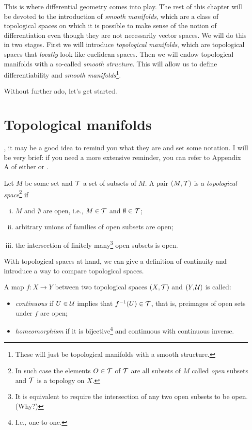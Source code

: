 This is where differential geometry comes into play.
The rest of this chapter will be devoted to the introduction of \emph{smooth manifolds}, which are a class of topological spaces on which it is possible to make sense of the notion of differentiation even though they are not necessarily vector spaces.
We will do this in two stages.
First we will introduce \emph{topological manifolds}, which are topological spaces that \emph{locally} look like euclidean spaces.
Then we will endow topological manifolds with a so-called \emph{smooth structure}.
This will allow us to define differentiability and \emph{smooth manifolds}\footnote{These will just be topological manifolds with a smooth structure.}.

Without further ado, let's get started.

\section{Topological manifolds}

, it may be a good idea to remind you what they are and set some notation.
I will be very brief: if you need a more extensive reminder, you can refer to Appendix A of either \cite{book:tu} or \cite{book:lee}.

\begin{definition}
  Let $M$ be some set and $\mathcal{T}$ a set of subsets of $M$.
  A pair $(M, \mathcal{T})$ is a \emph{topological space}\footnote{In such case the elements $O\in\mathcal{T}$ of $\mathcal{T}$ are all subsets of $M$ called \emph{open} subsets and $\mathcal{T}$ is a topology on $X$.} if
  \begin{enumerate}[(i)]
    \item $M$ and $\emptyset$ are open, i.e., $M\in \mathcal{T}$ and $\emptyset\in\mathcal{T}$;
    \item arbitrary unions of families of open subsets are open;
    \item the intersection of finitely many\footnote{It is equivalent to require the intersection of any two open subsets to be open. (Why?)} open subsets is open.
  \end{enumerate}
\end{definition}

With topological spaces at hand, we can give a definition of continuity and introduce a way to compare topological spaces.

\begin{definition}
  A map $f: X \to Y$ between two topological spaces $(X,\mathcal{T})$ and $(Y, \mathcal{U})$ is called:
  \begin{itemize}
    \item \emph{continuous} if $U\in\mathcal{U}$ implies that $f^{-1}(U)\in\mathcal{T}$, that is, preimages of open sets under $f$ are open;
    \item \emph{homeomorphism} if it is bijective\footnote{I.e., one-to-one.} and continuous with continuous inverse.
  \end{itemize}
\end{definition}

